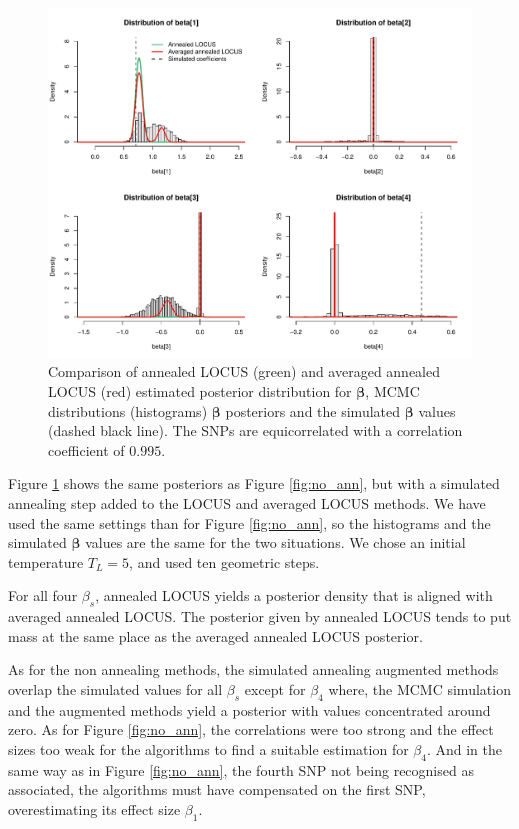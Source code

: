 \documentclass[a4paper, 11pt]{report}
\numberwithin{equation}{chapter}
\begin{document}
\begin{figure}[h]
\centering
\includegraphics[width=\textwidth, bb=0 0 9.8in 8.07in]{images/MCMC_anneal.pdf}
\caption{\label{fig:ann}Comparison of annealed LOCUS (green) and averaged annealed LOCUS (red) estimated posterior distribution for $\boldsymbol{\beta}$, MCMC distributions (histograms) $\boldsymbol{\beta}$ posteriors and the simulated $\boldsymbol{\beta}$ values (dashed black line). The SNPs are equicorrelated with a correlation coefficient of $0.995$.}
\end{figure}

Figure \ref{fig:ann} shows the same posteriors as Figure \ref{fig:no_ann}, but with a simulated annealing step added to the LOCUS and averaged LOCUS methods. We have used the same settings than for Figure \ref{fig:no_ann}, so the histograms and the simulated $
\boldsymbol{\beta}$ values are the same for the two situations. We chose an initial temperature $T_L = 5$, and used ten geometric steps.

For all four $\beta_s$, annealed LOCUS yields a posterior density that is aligned with averaged annealed LOCUS. The posterior given by annealed LOCUS tends to put mass at the same place as the averaged annealed LOCUS posterior.

As for the non annealing methods, the simulated annealing augmented methods overlap the simulated values for all $\beta_s$ except for $\beta_4$ where, the MCMC simulation and the augmented methods yield a posterior with values concentrated around zero. As for Figure \ref{fig:no_ann}, the correlations were too strong and the effect sizes too weak for the algorithms to find a suitable estimation for $\beta_4$. And in the same way as in Figure \ref{fig:no_ann}, the fourth SNP not being recognised as associated, the algorithms must have compensated on the first SNP, overestimating its effect size $\beta_1$.
\end{document}
